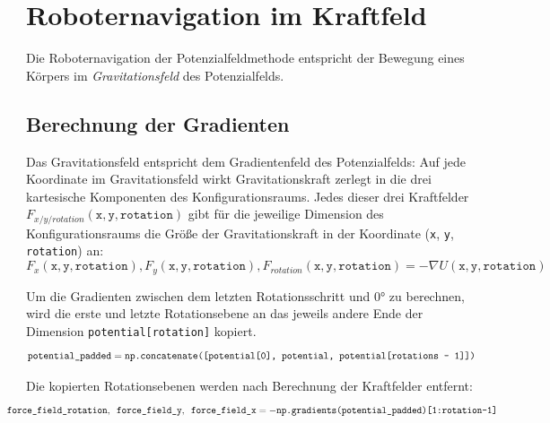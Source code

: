 \chapter{Roboternavigation im Kraftfeld}

Die Roboternavigation der Potenzialfeldmethode entspricht der Bewegung eines Körpers im \textit{Gravitationsfeld} des Potenzialfelds.

\section{Berechnung der Gradienten}

Das Gravitationsfeld entspricht dem Gradientenfeld des Potenzialfelds: Auf jede Koordinate im Gravitationsfeld wirkt Gravitationskraft zerlegt in die drei kartesische Komponenten des Konfigurationsraums. Jedes dieser drei Kraftfelder $F_{x/y/rotation}(\texttt{x}, \texttt{y}, \texttt{rotation})$ gibt für die jeweilige Dimension des Konfigurationsraums die Größe der Gravitationskraft in der Koordinate (\texttt{x}, \texttt{y}, \texttt{rotation}) an:
\begin{equation*}
 F_{x}(\texttt{x}, \texttt{y}, \texttt{rotation}), F_{y}(\texttt{x}, \texttt{y}, \texttt{rotation}), F_{rotation}(\texttt{x}, \texttt{y}, \texttt{rotation}) = -\nabla U(\texttt{x}, \texttt{y}, \texttt{rotation})
\end{equation*}

Um die Gradienten zwischen dem letzten Rotationsschritt und $0$° zu berechnen, wird die erste und letzte Rotationsebene an das jeweils andere Ende der Dimension \texttt{potential[rotation]} kopiert.
\begin{equation*}
\hspace*{-0.0075\linewidth}
\resizebox{1.05\linewidth}{!}{
$
	\texttt{potential\_padded} = \texttt{np.concatenate([potential[0], potential, potential[\texttt{rotations - 1}]])}
$
}
\hspace*{-0.0075\linewidth}
\end{equation*}

Die kopierten Rotationsebenen werden nach Berechnung der Kraftfelder entfernt:
\begin{equation*}
\hspace*{-0.075\linewidth}
\resizebox{1.15\linewidth}{!}{
$
\texttt{force\_field\_rotation}, \texttt{ force\_field\_y}, \texttt{ force\_field\_x} = -\texttt{np.gradients(potential\_padded)[1:rotation-1]}
$
}
\hspace*{-0.075\linewidth}
\end{equation*}

